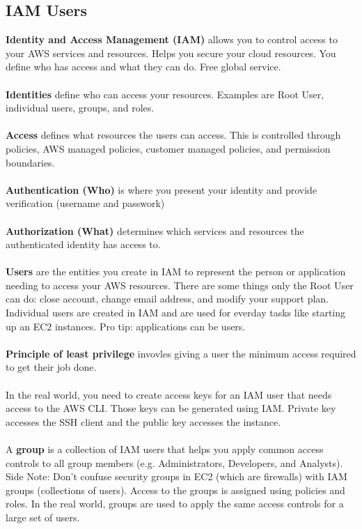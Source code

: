 \documentclass{article}%
\begin{document}
\subsection{IAM Users}
\textbf{Identity and Access Management (IAM)} allows you to control access to your AWS services and resources. Helps you secure your cloud resources. You define who has access and what they can do. Free global service. \\ \\
\textbf{Identities} define who can access your resources. Examples are Root User, individual users, groups, and roles. \\ \\
\textbf{Access} defines what resources the users can access. This is controlled through policies, AWS managed policies, customer managed policies, and permission boundaries. \\ \\
\textbf{Authentication (Who)} is where you present your identity and provide verification (username and passwork) \\ \\
\textbf{Authorization (What)} determines which services and resources the authenticated identity has access to. \\ \\
\textbf{Users} are the entities you create in IAM to represent the person or application needing to access your AWS resources. There are some things only the Root User can do: close account, change email address, and modify your support plan. Individual users are created in IAM and are used for everday tasks like starting up an EC2 instances. Pro tip: applications can be users. \\ \\
\textbf{Principle of least privilege} invovles giving a user the minimum access required to get their job done. \\ \\
In the real world, you need to create access keys for an IAM user that needs access to the AWS CLI. Those keys can be generated using IAM. Private key accesses the SSH client and the public key accesses the instance.  \\ \\
A \textbf{group} is a collection of IAM users that helps you apply common access controls to all group members (e.g. Administrators, Developers, and Analysts). Side Note: Don't confuse security groups in EC2 (which are firewalls) with IAM groups (collections of users). Access to the groups is assigned using policies and roles. In the real world, groups are used to apply the same access controls for a large set of users. 
\end{document}
